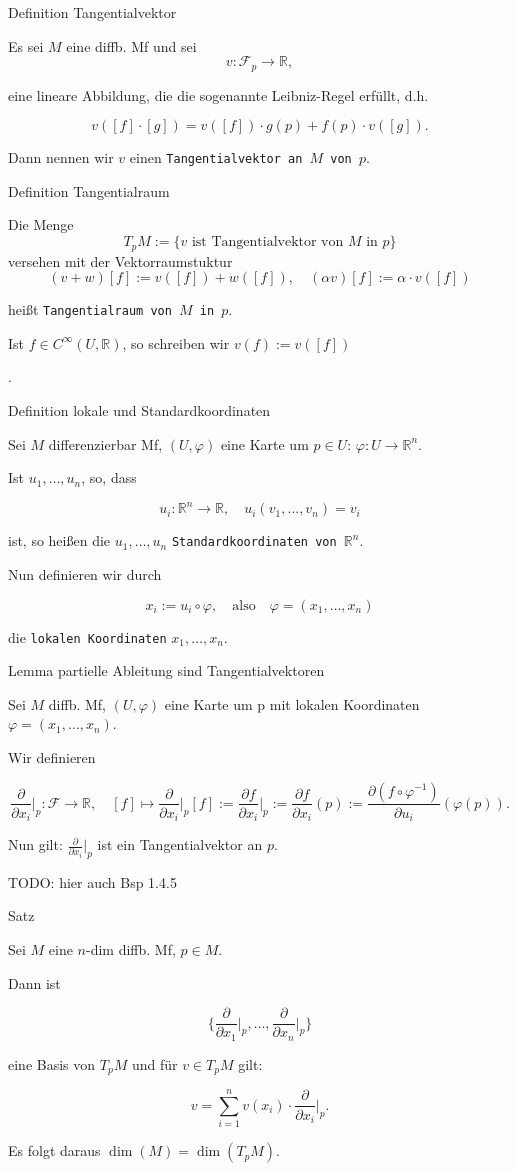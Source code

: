 \documentclass[a6paper,11pt,grid=front]{kartei}
\newcommand{\fl}[1]{\begin{flushleft}
 #1 \end{flushleft}}
\newcommand{\R}{\mathbb{R}}
\newcommand{\pp}[1][i]{\frac{\partial}{\partial x_{#1}}\bigg|_p}
\newcounter{def}
\begin{document}
\nonameyet
{Definition} {Tangentialvektor}
{
Es sei $M$ eine diffb. Mf und sei
\[
v : \mathcal{F}_p \to \R,
\]
\fl{eine lineare Abbildung, die die sogenannte Leibniz-Regel erfüllt, d.h.}
\[
v([f]\cdot[g]) = v([f])\cdot g(p) + f(p)\cdot v([g]).
\]
\fl{Dann nennen wir $v$ einen \texttt{Tangentialvektor an $M$ von $p$}.}
}
{}


\nonameyet
{Definition} {Tangentialraum}
{
Die Menge
\[
T_pM := \{ v \text { ist Tangentialvektor von $M$ in $p$}\}
\]
versehen mit der Vektorraumstuktur
\[
(v+w)[f] := v([f]) + w([f]), \quad (\alpha v)[f] := \alpha \cdot v([f])
\]
\fl{heißt \texttt{Tangentialraum von $M$ in $p$}.}
\fl{Ist $f\in C^\infty(U,\R)$, so schreiben wir $v(f) := v([f])$}.
}
{}



\nonameyet
{Definition} {lokale und Standardkoordinaten}
{
Sei $M$ differenzierbar Mf, $(U,\varphi)$ eine Karte um $p \in U$:
$\varphi: U \to \R^n$. 
\fl{Ist $u_1,\dots, u_n$, so, dass}
\[
u_i : \R^n \to \R, \quad u_i(v_1,\dots,v_n) = v_i
\]
\fl{ist, so heißen die $u_1,\dots,u_n$ \texttt{Standardkoordinaten von 
$\R^n$}.}
%
\fl{Nun definieren wir durch}
\[
x_i := u_i \circ \varphi, \quad \text{also} \quad 
\varphi = (x_1,\dots,x_n)
\]
\fl{die \texttt{lokalen Koordinaten} $x_1,\dots,x_n$.}
}
{}

\nonameyet
{\footnotesize Lemma} {\scriptsize partielle Ableitung sind Tangentialvektoren}
{
\footnotesize
Sei $M$ diffb. Mf, $(U,\varphi)$ eine Karte um p mit lokalen Koordinaten 
$\varphi= (x_1,\dots,x_n)$.
\fl{Wir definieren}
\[
\frac{\partial}{\partial x_i}\bigg|_p : \mathcal{F} \to \R,
\quad
[f] \mapsto \frac{\partial}{\partial x_i}\bigg|_p [f] 
:= \frac{\partial f }{\partial x_i}\bigg|_p
:= \frac{\partial f }{\partial x_i}(p)
:= \frac{\partial (f\circ \varphi^{-1})}{\partial u_i} (\varphi(p)).
\]
\fl{Nun gilt: $\frac{\partial}{\partial x_i}\bigg|_p$ ist ein Tangentialvektor 
an $p$.}	
TODO: hier auch Bsp 1.4.5
}
{}
\nonameyet
{Satz} {}
{
Sei $M$ eine $n$-dim diffb. Mf, $p\in M$.
\fl{Dann ist }
\[
\{\pp[1],\dots,\pp[n]\}
\]
\fl{eine Basis von $T_pM$ und für $v \in T_p M$ gilt:}
\[
v = \sum_{i=1}^n v(x_i) \cdot \pp.
\]
\fl{Es folgt daraus $\dim(M) = \dim(T_pM)$.}
}
{}

\end{document}
